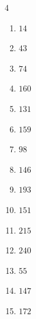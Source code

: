 \begin{multicols}{4}
\begin{enumerate}

  \item $14$


  \item $43$


  \item $74$


  \item $160$


  \item $131$


  \item $159$


  \item $98$


  \item $146$


  \item $193$


  \item $151$


  \item $215$


  \item $240$


\columnbreak %

  \item $55$


  \item $147$


  \item $172$



\end{enumerate}
\end{multicols}
